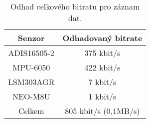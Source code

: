 \begin{table}[h!]
\centering
\begin{tabular}{c|c}

Senzor & Odhadovaný bitrate \\ 
\hline 
\hline 
ADIS16505-2 & 375 kbit/s \\ 

MPU-6050 & 422 kbit/s \\ 

LSM303AGR & 7 kbit/s \\ 

NEO-M8U & 1 kbit/s \\ 
\hline

Celkem & 805 kbit/s (0,1MB/s) \\ 

\end{tabular} 
\caption{Odhad celkového bitratu pro záznam dat.} 
\label{table:memoryBW}
\end{table} 